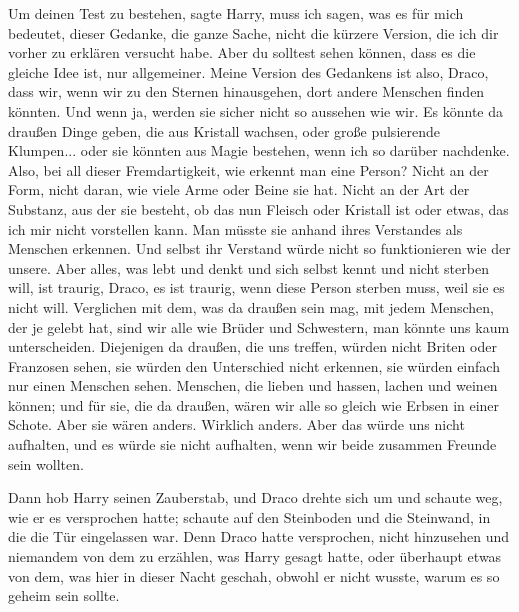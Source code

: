 \glqq{}Um deinen Test zu bestehen\grqq{}, sagte Harry, \glqq{}muss ich sagen, was
es für mich bedeutet, dieser Gedanke, die ganze Sache, nicht die kürzere
Version, die ich dir vorher zu erklären versucht habe. Aber du solltest sehen
können, dass es die gleiche Idee ist, nur allgemeiner. Meine Version des
Gedankens ist also, Draco, dass wir, wenn wir zu den Sternen hinausgehen, dort
andere Menschen finden könnten. Und wenn ja, werden sie sicher nicht so aussehen
wie wir. Es könnte da draußen Dinge geben, die aus Kristall wachsen, oder große
pulsierende Klumpen... oder sie könnten aus Magie bestehen, wenn ich so darüber
nachdenke. Also, bei all dieser Fremdartigkeit, wie erkennt man eine Person?
Nicht an der Form, nicht daran, wie viele Arme oder Beine sie hat. Nicht an der
Art der Substanz, aus der sie besteht, ob das nun Fleisch oder Kristall ist oder
etwas, das ich mir nicht vorstellen kann. Man müsste sie anhand ihres Verstandes
als Menschen erkennen. Und selbst ihr Verstand würde nicht so funktionieren wie
der unsere. Aber alles, was lebt und denkt und sich selbst kennt und nicht
sterben will, ist traurig, Draco, es ist traurig, wenn diese Person sterben
muss, weil sie es nicht will. Verglichen mit dem, was da draußen sein mag, mit
jedem Menschen, der je gelebt hat, sind wir alle wie Brüder und Schwestern, man
könnte uns kaum unterscheiden. Diejenigen da draußen, die uns treffen, würden
nicht Briten oder Franzosen sehen, sie würden den Unterschied nicht erkennen,
sie würden einfach nur einen Menschen sehen. Menschen, die lieben und hassen,
lachen und weinen können; und für sie, die da draußen, wären wir alle so gleich
wie Erbsen in einer Schote. Aber sie wären anders. Wirklich anders. Aber das
würde uns nicht aufhalten, und es würde sie nicht aufhalten, wenn wir beide
zusammen Freunde sein wollten.\grqq{}

Dann hob Harry seinen Zauberstab, und Draco drehte sich um und schaute weg, wie
er es versprochen hatte; schaute auf den Steinboden und die Steinwand, in die
die Tür eingelassen war. Denn Draco hatte versprochen, nicht hinzusehen und
niemandem von dem zu erzählen, was Harry gesagt hatte, oder überhaupt etwas von
dem, was hier in dieser Nacht geschah, obwohl er nicht wusste, warum es so
geheim sein sollte.

